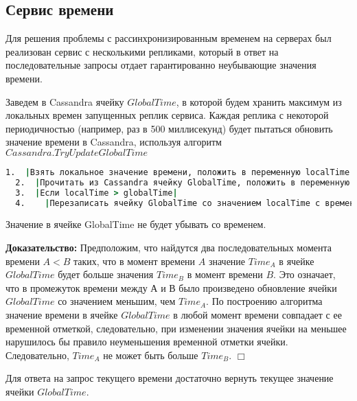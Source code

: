 \subsection{Сервис времени}

Для решения проблемы с рассинхронизированным временем на серверах был реализован сервис с несколькими репликами, который в ответ на последовательные запросы отдает гарантированно неубывающие значения времени.

Заведем в Cassandra ячейку $GlobalTime$, в которой будем хранить максимум из локальных времен запущенных реплик сервиса. Каждая реплика с некоторой периодичностью (например, раз в 500 миллисекунд) будет пытаться обновить значение времени в Cassandra, используя алгоритм $Cassandra.TryUpdateGlobalTime$

\begin{lstlisting}[language=csh,caption={Алгоритм Cassandra.TryUpdateGlobalTime}]
  1.  |Взять локальное значение времени, положить в переменную localTime|
  2.  |Прочитать из Cassandra ячейку GlobalTime, положить в переменную globalTime|
  3.  |Если localTime > globalTime|
  4.  	|Перезаписать ячейку GlobalTime со значением localTime с временной отметкой localTime|
\end{lstlisting}

\begin{theorem}
Значение в ячейке GlobalTime не будет убывать со временем.
\end{theorem}
\textbf{Доказательство:}
Предположим, что найдутся два последовательных момента времени $A < B$ таких, что в момент времени $A$ значение $Time_A$ в ячейке $GlobalTime$ будет больше значения $Time_B$ в момент времени $B$. Это означает, что в промежуток времени между $А$ и $В$ было произведено обновление ячейки $GlobalTime$ со значением меньшим, чем $Time_A$. По построению алгоритма значение времени в ячейке $GlobalTime$ в любой момент времени совпадает с ее временной отметкой, следовательно, при изменении значения ячейки на меньшее нарушилось бы правило неуменьшения временной отметки ячейки. Следовательно, $Time_A$ не может быть больше $Time_B$.
$\Box$

Для ответа на запрос текущего времени достаточно вернуть текущее значение ячейки $GlobalTime$.
